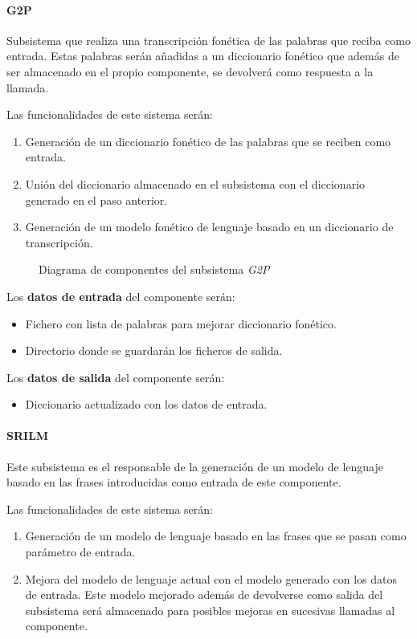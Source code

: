 \documentclass[../main.tex]{subfiles}
\begin{document}
\paragraph{G2P}\label{par:g2p}
Subsistema que realiza una transcripción fonética de las palabras que reciba como entrada. Estas palabras serán añadidas a un diccionario fonético que además de ser almacenado en el propio componente, se devolverá como respuesta a la llamada.

Las funcionalidades de este sistema serán:
\begin{enumerate}
    \item Generación de un diccionario fonético de las palabras que se reciben como entrada.
    \item Unión del diccionario almacenado en el subsistema con el diccionario generado en el paso anterior.
    \item Generación de un modelo fonético de lenguaje basado en un diccionario de transcripción.
\end{enumerate}

\begin{figure}[H]
    \centering
    
    \label{fig:components_g2p}
    \caption{Diagrama de componentes del subsistema \textit{G2P}}
\end{figure}

Los \textbf{datos de entrada} del componente serán:
\begin{itemize}
    \item Fichero con lista de palabras para mejorar diccionario fonético.
    \item Directorio donde se guardarán los ficheros de salida.
\end{itemize}

Los \textbf{datos de salida} del componente serán:
\begin{itemize}
    \item Diccionario actualizado con los datos de entrada.
\end{itemize}

\paragraph{SRILM}\label{par:srilm}
Este subsistema es el responsable de la generación de un modelo de lenguaje basado en las frases introducidas como entrada de este componente.

Las funcionalidades de este sistema serán:
\begin{enumerate}
    \item Generación de un modelo de lenguaje basado en las frases que se pasan como parámetro de entrada.
    \item Mejora del modelo de lenguaje actual con el modelo generado con los datos de entrada. Este modelo mejorado además de devolverse como salida del subsistema será almacenado para posibles mejoras en sucesivas llamadas al componente.
\end{enumerate}
\end{document}
